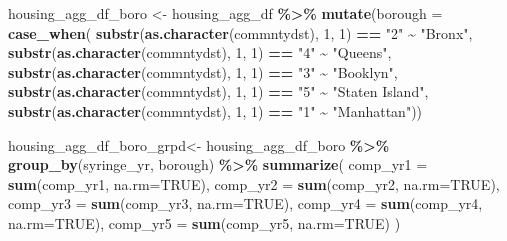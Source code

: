 \documentclass[
]{article}
\newenvironment{Shaded}{\begin{snugshade}}{\end{snugshade}}
\newcommand{\AttributeTok}[1]{\textcolor[rgb]{0.13,0.29,0.53}{#1}}
\newcommand{\ConstantTok}[1]{\textcolor[rgb]{0.56,0.35,0.01}{#1}}
\newcommand{\DecValTok}[1]{\textcolor[rgb]{0.00,0.00,0.81}{#1}}
\newcommand{\FunctionTok}[1]{\textcolor[rgb]{0.13,0.29,0.53}{\textbf{#1}}}
\newcommand{\NormalTok}[1]{#1}
\newcommand{\OtherTok}[1]{\textcolor[rgb]{0.56,0.35,0.01}{#1}}
\newcommand{\SpecialCharTok}[1]{\textcolor[rgb]{0.81,0.36,0.00}{\textbf{#1}}}
\newcommand{\StringTok}[1]{\textcolor[rgb]{0.31,0.60,0.02}{#1}}
\begin{document}
\begin{Shaded}
\begin{Highlighting}[]
\NormalTok{housing\_agg\_df\_boro }\OtherTok{\textless{}{-}}\NormalTok{ housing\_agg\_df }\SpecialCharTok{\%\textgreater{}\%}
  \FunctionTok{mutate}\NormalTok{(}\AttributeTok{borough =} \FunctionTok{case\_when}\NormalTok{(}
    \FunctionTok{substr}\NormalTok{(}\FunctionTok{as.character}\NormalTok{(commntydst), }\DecValTok{1}\NormalTok{, }\DecValTok{1}\NormalTok{) }\SpecialCharTok{==} \StringTok{"2"} \SpecialCharTok{\textasciitilde{}} \StringTok{"Bronx"}\NormalTok{,}
    \FunctionTok{substr}\NormalTok{(}\FunctionTok{as.character}\NormalTok{(commntydst), }\DecValTok{1}\NormalTok{, }\DecValTok{1}\NormalTok{) }\SpecialCharTok{==} \StringTok{"4"} \SpecialCharTok{\textasciitilde{}} \StringTok{"Queens"}\NormalTok{,}
    \FunctionTok{substr}\NormalTok{(}\FunctionTok{as.character}\NormalTok{(commntydst), }\DecValTok{1}\NormalTok{, }\DecValTok{1}\NormalTok{) }\SpecialCharTok{==} \StringTok{"3"} \SpecialCharTok{\textasciitilde{}} \StringTok{"Booklyn"}\NormalTok{,}
    \FunctionTok{substr}\NormalTok{(}\FunctionTok{as.character}\NormalTok{(commntydst), }\DecValTok{1}\NormalTok{, }\DecValTok{1}\NormalTok{) }\SpecialCharTok{==} \StringTok{"5"} \SpecialCharTok{\textasciitilde{}} \StringTok{"Staten Island"}\NormalTok{,}
    \FunctionTok{substr}\NormalTok{(}\FunctionTok{as.character}\NormalTok{(commntydst), }\DecValTok{1}\NormalTok{, }\DecValTok{1}\NormalTok{) }\SpecialCharTok{==} \StringTok{"1"} \SpecialCharTok{\textasciitilde{}} \StringTok{"Manhattan"}\NormalTok{))}

\NormalTok{housing\_agg\_df\_boro\_grpd}\OtherTok{\textless{}{-}}\NormalTok{ housing\_agg\_df\_boro }\SpecialCharTok{\%\textgreater{}\%}
  \FunctionTok{group\_by}\NormalTok{(syringe\_yr, borough) }\SpecialCharTok{\%\textgreater{}\%}
  \FunctionTok{summarize}\NormalTok{(}
    \AttributeTok{comp\_yr1 =} \FunctionTok{sum}\NormalTok{(comp\_yr1, }\AttributeTok{na.rm=}\ConstantTok{TRUE}\NormalTok{),}
    \AttributeTok{comp\_yr2 =} \FunctionTok{sum}\NormalTok{(comp\_yr2, }\AttributeTok{na.rm=}\ConstantTok{TRUE}\NormalTok{),}
    \AttributeTok{comp\_yr3 =} \FunctionTok{sum}\NormalTok{(comp\_yr3, }\AttributeTok{na.rm=}\ConstantTok{TRUE}\NormalTok{),}
    \AttributeTok{comp\_yr4 =} \FunctionTok{sum}\NormalTok{(comp\_yr4, }\AttributeTok{na.rm=}\ConstantTok{TRUE}\NormalTok{),}
    \AttributeTok{comp\_yr5 =} \FunctionTok{sum}\NormalTok{(comp\_yr5, }\AttributeTok{na.rm=}\ConstantTok{TRUE}\NormalTok{)}
\NormalTok{  )}


\end{Highlighting}
\end{Shaded}
\end{document}
